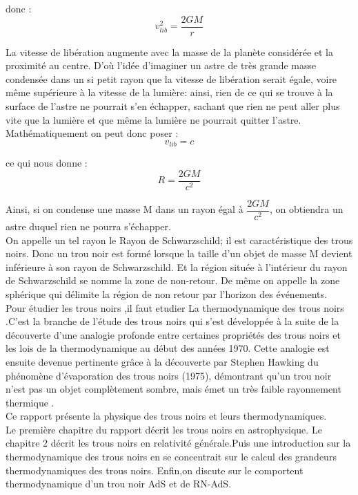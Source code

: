 \documentclass[12pt,  a4paper, openright]{report} %
\begin{document}
	donc :
	\begin{equation}
	v_{lib}^{2}=\dfrac{2GM}{r}
	\end{equation}

	La vitesse de libération augmente avec la masse de la planète considérée et la proximité au centre. D'où l'idée d'imaginer un astre de très grande masse condensée dans un si petit rayon que la vitesse de libération serait égale, voire même supérieure à la vitesse de la lumière: ainsi, rien de ce qui se trouve à la surface de l'astre ne pourrait s'en échapper, sachant que rien ne peut aller plus vite que la lumière et que même la lumière ne pourrait quitter l'astre. Mathématiquement on peut donc poser :
	\begin{equation}
	v_{lib} = c
	\end{equation}

	ce qui nous donne :
	\begin{equation}
	R = \dfrac{2GM}{c^{2}}
	\end{equation}

	Ainsi, si on condense une masse M dans un rayon égal à $\dfrac{2GM}{c^{2}}$, on obtiendra un astre duquel rien ne pourra s'échapper.\\
	On appelle un tel rayon le Rayon de Schwarzschild; il est caractéristique des trous noirs.
	Donc un trou noir est formé lorsque la taille d’un objet de masse M devient inférieure à son
	rayon de Schwarzschild. Et la région située à l’intérieur du rayon de Schwarzschild se nomme la
	zone de non-retour. De même on appelle la zone sphérique qui délimite la région de non retour
	par l’horizon des événements.\\
	Pour étudier les trous noirs ,il faut etudier La thermodynamique des trous noirs .C'est la branche de l'étude des trous noirs qui s'est développée à la suite de la découverte d'une analogie profonde entre certaines propriétés des trous noirs et les lois de la thermodynamique au début des années 1970. Cette analogie est ensuite devenue pertinente grâce à la découverte par Stephen Hawking du phénomène d'évaporation des trous noirs (1975), démontrant qu'un trou noir n'est pas un objet complètement sombre, mais émet un très faible rayonnement thermique \cite{1} .\\
	Ce rapport présente la physique des trous noirs et leurs thermodynamiques.\\ Le première chapitre du rapport décrit les trous noirs en astrophysique. Le
	chapitre 2 décrit  les trous noirs en relativité générale.Puis une introduction sur la thermodynamique des trous noirs en se concentrait sur le calcul des grandeurs
	thermodynamiques des trous noirs. Enfin,on discute sur le comportent thermodynamique d’un trou noir AdS et de RN-AdS.
	
\end{document}
